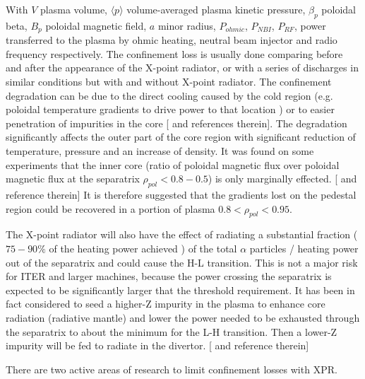 With $V$ plasma volume, $\langle p \rangle$ volume-averaged plasma kinetic pressure, ${{ \beta }_{ p }}$ poloidal beta, $B_p$ poloidal magnetic field, $a$ minor radius, $P_{ohmic}$, $P_{NBI}$, $P_{RF}$, power transferred to the plasma by ohmic heating, neutral beam injector and radio frequency respectively. \cite{SalarElahi2010,Wesson2011} The confinement loss is usually done comparing before and after the appearance of the X-point radiator, or with a series of discharges in similar conditions but with and without X-point radiator.
The confinement degradation can be due to the direct cooling caused by the cold region (e.g. poloidal temperature gradients to drive power to that location \cite{Lipschultz1998} ) or to easier penetration of impurities in the core [\cite{Lipschultz2016} and references therein]. The degradation significantly affects the outer part of the core region with significant reduction of temperature, pressure and an increase of density. \cite{Kallenbach2015a}  It was found on some experiments that the inner core (ratio of poloidal magnetic flux over poloidal magnetic flux at the separatrix $ \rho _{pol}<0.8-0.5 $) is only marginally effected. [\cite{Reinke2013} and reference therein] It is therefore suggested that the gradients lost on the pedestal region could be recovered in a portion of plasma $0.8< \rho _{pol}<0.95$. \cite{Reimold2015}

The X-point radiator will also have the effect of radiating a substantial fraction ($75-90\%$ of the heating power achieved \cite{Bernert2017}) of the total $ \alpha $ particles / heating power out of the separatrix and could cause the H-L transition. This is not a major risk for ITER and larger machines, because the power crossing the separatrix is expected to be significantly larger that the threshold requirement. It has been in fact considered to seed a higher-Z impurity in the plasma to enhance core radiation (radiative mantle) and lower the power needed to be exhausted through the separatrix to about the minimum for the L-H transition. Then a lower-Z impurity will be fed to radiate in the divertor. [\cite{Kallenbach2015a,Reinke2013} and reference therein]


There are two active areas of research to limit confinement losses with XPR.

